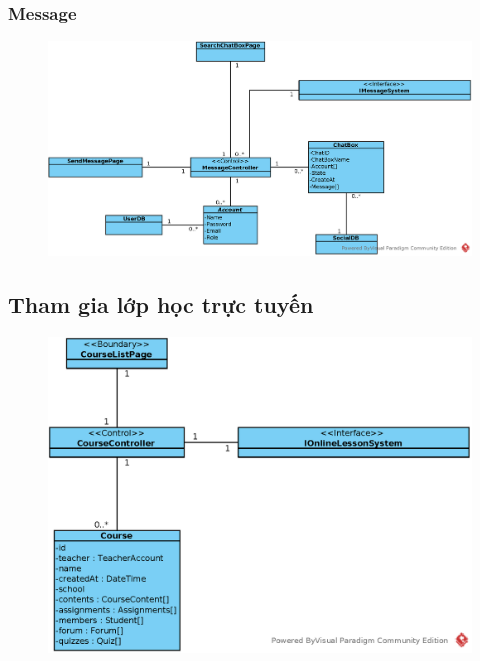 \documentclass[./../main_file.tex]{subfiles}
\begin{document}
\subsubsection{Message}
\begin{figure}[H]
	\centering
	\includegraphics[width=\linewidth]{./images/define_attribute/ucd_atr_message.eps}
\end{figure}
\subsection{Tham gia lớp học trực tuyến}
\begin{figure}[H]
	\centering
	\includegraphics[width=\linewidth]{./images/define_attribute/ucd_atr_ss_join_online_class.eps}
\end{figure}
\end{document}
